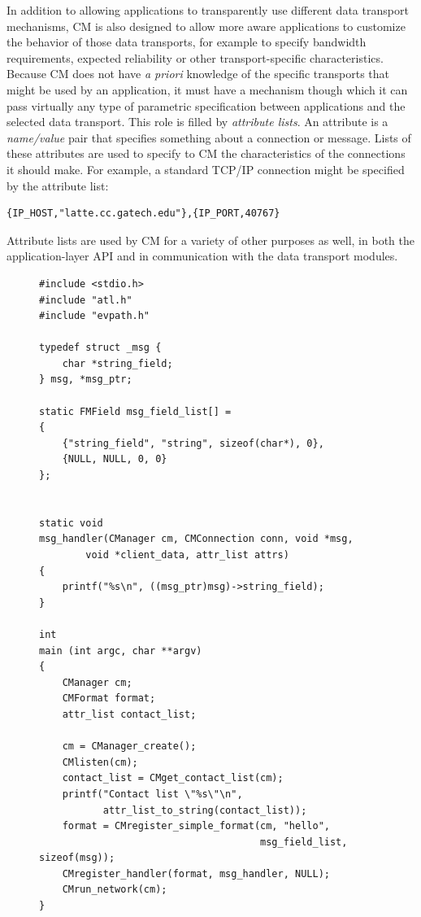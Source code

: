 \documentclass[11pt]{article}
\begin{document}
In addition to allowing applications to transparently use different data
transport mechanisms, CM is also designed to allow more aware applications
to customize the behavior of those data transports, for example to specify
bandwidth requirements, expected reliability or other transport-specific
characteristics.  Because CM does not have {\it a priori} knowledge of the
specific transports that might be used by an application, it must have a
mechanism though which it can pass virtually any type of parametric
specification between applications and the selected data transport.  This
role is filled by {\it attribute lists}.  An attribute is a {\it name/value}
pair that specifies something about a connection or message.  Lists of these
attributes are used to specify to CM the characteristics of the connections
it should make.  For example, a standard TCP/IP connection might be
specified by the attribute list:  
\begin{verbatim}
{IP_HOST,"latte.cc.gatech.edu"},{IP_PORT,40767}
\end{verbatim}
Attribute lists are used by CM for a variety of other purposes as well, in
both the application-layer API and in communication with the data transport
modules.   
\enlargethispage{\baselineskip}
\pagebreak

\begin{figure}
{
\vspace*{-0.35in}
\begin{verbatim}
#include <stdio.h>
#include "atl.h"
#include "evpath.h"

typedef struct _msg {
    char *string_field;
} msg, *msg_ptr;

static FMField msg_field_list[] =
{
    {"string_field", "string", sizeof(char*), 0},
    {NULL, NULL, 0, 0}
};


static void
msg_handler(CManager cm, CMConnection conn, void *msg,
        void *client_data, attr_list attrs)
{
    printf("%s\n", ((msg_ptr)msg)->string_field);
}

int
main (int argc, char **argv)
{
    CManager cm;
    CMFormat format;
    attr_list contact_list;

    cm = CManager_create();
    CMlisten(cm);
    contact_list = CMget_contact_list(cm);
    printf("Contact list \"%s\"\n", 
           attr_list_to_string(contact_list));
    format = CMregister_simple_format(cm, "hello", 
                                      msg_field_list, sizeof(msg));
    CMregister_handler(format, msg_handler, NULL);
    CMrun_network(cm);
}
\end{verbatim}
}
\end{figure}
\end{document}
